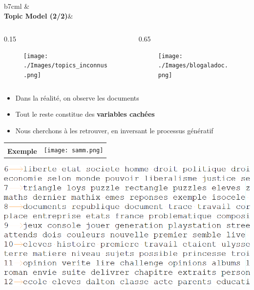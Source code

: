 \documentclass[12pt]{beamer}
\begin{document}
\begin{frame}
\begin{tabular}{b{7cm}l}
& \\ {\large \textbf{Topic Model (2/2)}}& 
\end{tabular}
\begin{columns}

\begin{column}{0.15\linewidth}
\centering
\begin{figure}
\texttt{[image: ./Images/topics\_inconnus.png]}
\end{figure}
\end{column}

\begin{column}{0.65\linewidth}
\centering
\begin{figure}
\texttt{[image: ./Images/blogaladoc.png]}
\end{figure}
\end{column}

\end{columns}

\begin{itemize}
\item Dans la réalité, on observe les documents
\pause
\item Tout le reste constitue des \textbf{variables cachées}
\item Nous cherchons à les retrouver, en inversant le processus génératif
\end{itemize}
\end{frame}

\begin{frame}
\begin{tabular}{b{7cm}l}
& \multirow{2}{*}{\texttt{[image: samm.png]}}\\ {\large \textbf{Exemple}}& 
\end{tabular}

\vspace{1.5cm}

\includegraphics[scale=0.2]{code4-clefs.png}

\end{frame}
\end{document}
